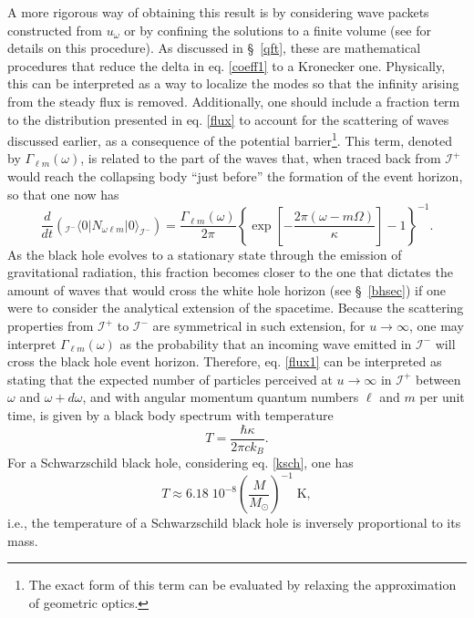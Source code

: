 \documentclass[
12pt,		%
openright,	%
twoside,  %
a4paper,			%
chapter=TITLE,		%
english,			%
french,				%
spanish,			%
brazil				%
]{USPSC-classe/USPSC}
\begin{document}
A more rigorous way of obtaining this result is by considering wave packets constructed from $u_{\omega}$ or by confining the solutions to a finite volume (see \cite{Parker2009} for details on this procedure). As discussed in \S~\ref{qft}, these are mathematical procedures that reduce the delta in eq. \ref{coeff1} to a Kronecker one. Physically, this can be interpreted as a way to localize the modes so that the infinity arising from the steady flux is removed. Additionally, one should include a fraction term to the distribution presented in eq. \ref{flux} to account for the scattering of waves discussed earlier, as a consequence of the potential barrier\footnote{The exact form of this term can be evaluated by relaxing the approximation of geometric optics.}. This term, denoted by $\Gamma_{\ell m}(\omega)$, is related to the part of the waves that, when traced back from $\mathscr{I}^+$ would reach the collapsing body ``just before'' the formation of the event horizon, so that one now has
\begin{equation}\label{flux1}
    \frac{d}{dt}\left(_{{\mathscr{I}^-}}\langle0|N_{\omega\ell m}|0\rangle_{\mathscr{I}^-}\right)=\frac{\Gamma_{\ell m}(\omega)}{2\pi}\left\{\exp\left[{-\frac{2\pi (\omega-m\Omega)}{\kappa}}\right]-1\right\}^{-1}.
\end{equation}
As the black hole evolves to a stationary state through the emission of gravitational radiation, this fraction becomes closer to the one that dictates the amount of waves that would cross the white hole horizon (see \S~\ref{bhsec}) if one were to consider the analytical extension of the spacetime. Because the scattering properties from $\mathscr{I}^+$ to $\mathscr{I}^-$ are symmetrical in such extension, for $u\to\infty$, one may interpret $\Gamma_{\ell m}(\omega)$ as the probability that an incoming wave emitted in $\mathscr{I}^-$ will cross the black hole event horizon. Therefore, eq. \ref{flux1} can be interpreted as stating that the expected number of particles perceived at $u\to\infty$ in $\mathscr{I}^+$ between $\omega$ and $\omega+d\omega$, and with angular momentum quantum numbers $\ell$ and $m$ per unit time, is given by a black body spectrum \cite{Swendsen2020} with temperature 
\begin{equation}\label{temperature}
    T=\frac{\hbar \kappa}{2\pi ck_B}.
\end{equation}
For a Schwarzschild black hole, considering eq. \ref{ksch}, one has
\begin{equation}
    T\approx 6.18\;10^{-8}\left(\frac{M}{M_\odot}\right)^{-1}\;\text{K},
\end{equation}
i.e., the temperature of a Schwarzschild black hole is inversely proportional to its mass. 
\end{document}
